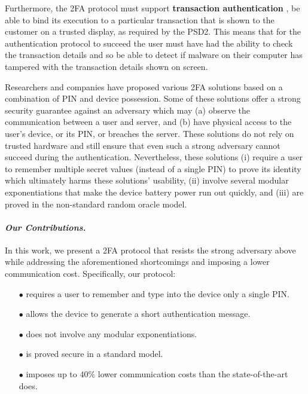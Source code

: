 Furthermore, the 2FA protocol must support \textbf{transaction authentication} \ie, be able to bind its execution to a particular transaction that is shown to the customer on a trusted display, as required by the PSD2.
This means that for the authentication protocol to succeed the user must have had the ability to check the transaction details and so be able to detect if malware on their computer has tampered with the transaction details shown on screen.

Researchers and companies have proposed various 2FA solutions based on a combination of PIN and device possession. Some of these solutions offer a strong security guarantee against an adversary which may (a) observe the communication between a user and server, and (b) have physical access to the user's device, or its PIN, or breaches the server. These solutions do not rely on trusted hardware and still ensure that even such a strong adversary cannot succeed during the authentication. Nevertheless, these solutions (i) require a user to remember multiple secret values (instead of a single PIN)  to prove its identity which ultimately harms these solutions' usability, (ii) involve several modular exponentiations that make the device battery power run out quickly, and (iii) are proved in the non-standard random oracle model.

\paragraph{\textbf{\textit{Our Contributions.}}}  In this work, we present a 2FA protocol that resists the strong adversary above while addressing the aforementioned shortcomings and imposing a lower communication cost. Specifically, our protocol:

\begin{itemize}
\item[$\bullet$] requires a user to remember and type into the device only a single PIN.

\item[$\bullet$] {allows the device to generate a short authentication message.} 

\item[$\bullet$] does not involve any modular exponentiations.

\item[$\bullet$] is proved secure in a standard model.

\item[$\bullet$]  imposes up to $40\%$ lower communication costs than the state-of-the-art does. 


\end{itemize}

